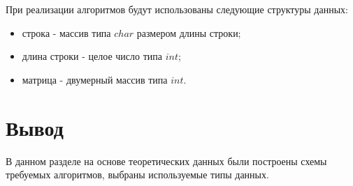 При реализации алгоритмов будут использованы следующие структуры данных:

\begin{itemize}
	\item строка - массив типа $char$ размером длины строки;
	\item длина строки - целое число типа $int$;
	\item матрица - двумерный массив типа $int$.
\end{itemize}

\section{Вывод}

В данном разделе на основе теоретических данных были построены схемы
требуемых алгоритмов, выбраны используемые типы данных.